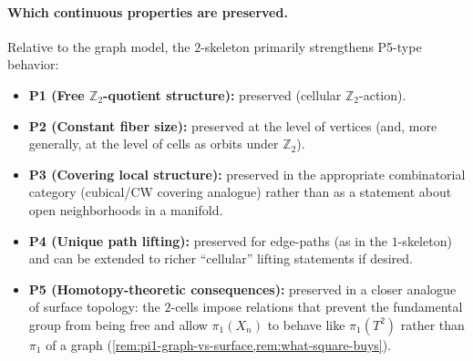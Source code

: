 \documentclass[11pt,a4paper]{article}
\theoremstyle{definition}
\theoremstyle{remark}
\begin{document}
\paragraph{Which continuous properties are preserved.}
Relative to the graph model, the \(2\)-skeleton primarily strengthens P5-type behavior:
\begin{itemize}
  \item \textbf{P1 (Free \(\mathbb{Z}_2\)-quotient structure):} preserved (cellular \(\mathbb{Z}_2\)-action).
  \item \textbf{P2 (Constant fiber size):} preserved at the level of vertices (and, more generally, at the level of cells as orbits under \(\mathbb{Z}_2\)).
  \item \textbf{P3 (Covering local structure):} preserved in the appropriate combinatorial category (cubical/CW covering analogue) rather than as a statement about open neighborhoods in a manifold.
  \item \textbf{P4 (Unique path lifting):} preserved for edge-paths (as in the \(1\)-skeleton) and can be extended to richer ``cellular'' lifting statements if desired.
  \item \textbf{P5 (Homotopy-theoretic consequences):} preserved in a closer analogue of surface topology: the \(2\)-cells impose relations that prevent the fundamental group from being free and allow \(\pi_1(X_n)\) to behave like \(\pi_1(T^2)\) rather than \(\pi_1\) of a graph (\cref{rem:pi1-graph-vs-surface,rem:what-square-buys}).
\end{itemize}
\end{document}
